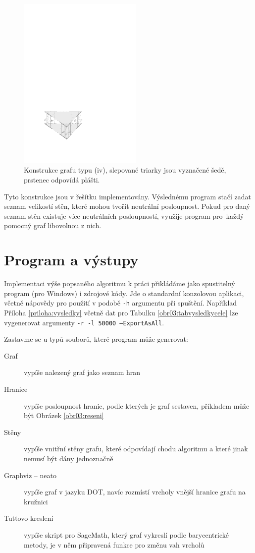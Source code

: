 \begin{figure}[h]\centering
\includegraphics[width = 60mm]{../img/iv-construction}
\caption{Konstrukce grafu typu (iv), slepované triarky jsou vyznačené šedě, prstenec odpovídá plášti.}
\label{obr03:konstrukceiv}
\end{figure}

Tyto konstrukce jsou v řešítku implementovány. Výslednému program stačí zadat seznam velikostí stěn, které mohou tvořit neutrální posloupnost. Pokud pro daný seznam stěn existuje více neutrálních posloupností, využije program pro~každý pomocný graf libovolnou z nich.




\section{Program a výstupy} \label{prg&vystupy}

Implementaci výše popsaného algoritmu k práci přikládáme jako spustitelný program (pro Windows) i zdrojové kódy. Jde o standardní konzolovou aplikaci, včetně nápovědy pro použití v podobě \texttt{-h} argumentu při spuštění. Například Příloha \ref{priloha:vysledky} včetně dat pro Tabulku \ref{obr03:tabvysledkycele} lze vygenerovat argumenty \texttt{-r -l 50000 --ExportAsAll}.

Zastavme se u typů souborů, které program může generovat:
\begin{description}

\item[Graf] vypíše nalezený graf jako seznam hran
\item[Hranice] vypíše posloupnost hranic, podle kterých je graf sestaven, příkladem může být Obrázek \ref{obr03:reseni}
\item[Stěny] vypíše vnitřní stěny grafu, které odpovídají chodu algoritmu a které jinak nemusí být dány jednoznačně
\item[Graphviz -- neato] vypíše graf v jazyku DOT, navíc rozmístí vrcholy vnější hranice grafu na kružnici
\item[Tuttovo kreslení] vypíše skript pro SageMath, který graf vykreslí podle barycentrické metody, je v něm připravená funkce pro změnu vah vrcholů

\end{description}


